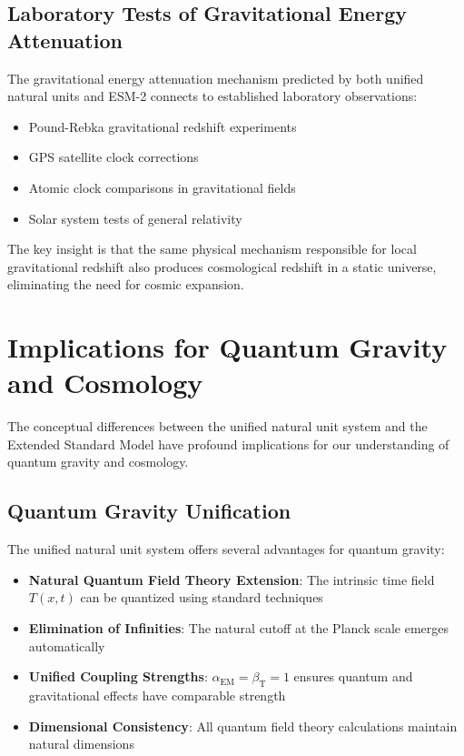 \documentclass[12pt,a4paper]{article}
\newcommand{\Tfieldt}{T(x,t)}
\newcommand{\alphaEM}{\alpha_{\text{EM}}}
\newcommand{\betaT}{\beta_{\text{T}}}
\begin{document}
	\subsection{Laboratory Tests of Gravitational Energy Attenuation}
	\label{subsec:laboratory_tests}
	
	The gravitational energy attenuation mechanism predicted by both unified natural units and ESM-2 connects to established laboratory observations:
	
	\begin{itemize}
		\item Pound-Rebka gravitational redshift experiments \cite{Pound1960}
		\item GPS satellite clock corrections \cite{Ashby2003}
		\item Atomic clock comparisons in gravitational fields \cite{Ludlow2015}
		\item Solar system tests of general relativity \cite{Bertotti2003}
	\end{itemize}
	
	The key insight is that the same physical mechanism responsible for local gravitational redshift also produces cosmological redshift in a static universe, eliminating the need for cosmic expansion.
	
	\section{Implications for Quantum Gravity and Cosmology}
	\label{sec:implications}
	
	The conceptual differences between the unified natural unit system and the Extended Standard Model have profound implications for our understanding of quantum gravity and cosmology.
	
	\subsection{Quantum Gravity Unification}
	\label{subsec:quantum_gravity_unification}
	
	The unified natural unit system offers several advantages for quantum gravity:
	
	\begin{itemize}
		\item \textbf{Natural Quantum Field Theory Extension}: The intrinsic time field $\Tfieldt$ can be quantized using standard techniques
		\item \textbf{Elimination of Infinities}: The natural cutoff at the Planck scale emerges automatically
		\item \textbf{Unified Coupling Strengths}: $\alphaEM = \betaT = 1$ ensures quantum and gravitational effects have comparable strength
		\item \textbf{Dimensional Consistency}: All quantum field theory calculations maintain natural dimensions \cite{pascher_lagrangian_2025}
	\end{itemize}
	
\end{document}
